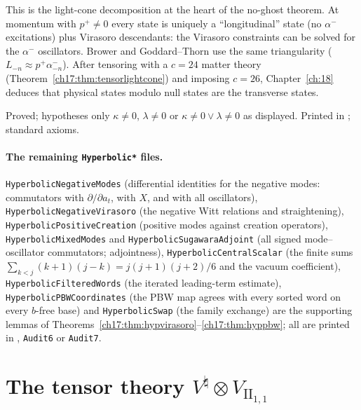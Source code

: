 \begin{physics}
This is the light-cone decomposition at the heart of the no-ghost theorem.  At momentum with $p^+\neq0$ every
state is uniquely a ``longitudinal'' state (no $\alpha^-$ excitations) plus Virasoro descendants: the Virasoro
constraints can be solved for the $\alpha^-$ oscillators.  Brower and Goddard--Thorn use the same triangularity
($L_{-n}\approx p^+\alpha^-_{-n}$).  After tensoring with a $c=24$ matter theory (Theorem~\ref{ch17:thm:tensorlightcone})
and imposing $c=26$, Chapter~\ref{ch:18} deduces that physical states modulo null states are the transverse
states.
\end{physics}

\begin{status}
Proved; hypotheses only $\kappa\ne0$, $\lambda\ne0$ or $\kappa\ne0\vee\lambda\ne0$ as displayed.  Printed in
; standard axioms.
\end{status}

\paragraph{The remaining \texttt{Hyperbolic*} files.}  \texttt{HyperbolicNegativeModes} (differential identities
for the negative modes: commutators with $\partial/\partial a_t$, with $X$, and with all oscillators),
\texttt{HyperbolicNegativeVirasoro} (the negative Witt relations and straightening),
\texttt{HyperbolicPositiveCreation} (positive modes against creation operators),
\texttt{HyperbolicMixedModes} and \texttt{HyperbolicSugawaraAdjoint} (all signed mode--oscillator commutators;
adjointness), \texttt{HyperbolicCentralScalar} (the finite sums $\sum_{k<j}(k+1)(j-k)=j(j+1)(j+2)/6$ and the vacuum
coefficient), \texttt{HyperbolicFilteredWords} (the iterated leading-term estimate),
\texttt{HyperbolicPBWCoordinates} (the PBW map agrees with every sorted word on every $b$-free base) and
\texttt{HyperbolicSwap} (the family exchange) are the supporting lemmas of
Theorems~\ref{ch17:thm:hypvirasoro}--\ref{ch17:thm:hyppbw}; all are printed in ,
\texttt{Audit6} or \texttt{Audit7}.

\section{The tensor theory \texorpdfstring{$V^\natural\otimes V_{\mathrm{II}_{1,1}}$}{V-natural x V(II(1,1))}}\label{ch17:sec:tensor}

